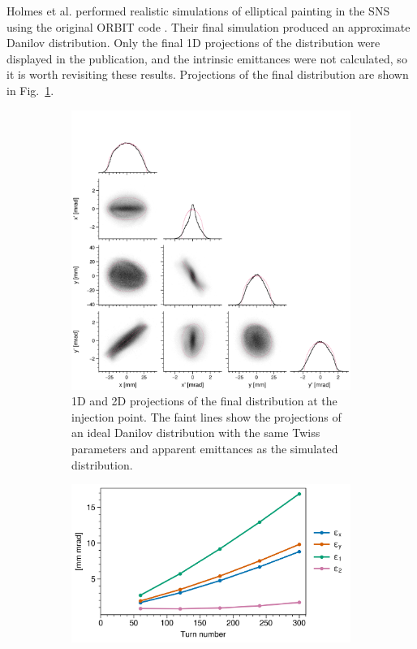 Holmes et al. performed realistic simulations of elliptical painting in the SNS using the original ORBIT code \cite{Holmes2018}. Their final simulation produced an approximate Danilov distribution. Only the final 1D projections of the distribution were displayed in the publication, and the intrinsic emittances were not calculated, so it is worth revisiting these results. Projections of the final distribution are shown in Fig.~\ref{fig:Holmes_corner_compare}.
%
\begin{figure}[!p]
    \centering
    \begin{subfigure}{0.8\textwidth}
        \includegraphics[width=\textwidth]{Images/chapter3/Holmes_corner_compare.png}
        \caption{1D and 2D projections of the final distribution at the injection point. The faint lines show the projections of an ideal Danilov distribution with the same Twiss parameters and apparent emittances as the simulated distribution.}
        \label{fig:Holmes_corner_compare}
    \end{subfigure}
    \vfill
    \vspace*{1.25cm}
    \vfill
    \begin{subfigure}{0.5\textwidth}
        \includegraphics[width=\textwidth]{Images/chapter3/Holmes_emittances.png}

\end{subfigure}
\end{figure}

